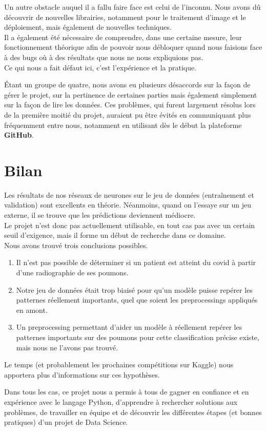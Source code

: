 \documentclass{article}
\begin{document}
	\par Un autre obstacle auquel il a fallu faire face est celui de l'inconnu. Nous avons dû découvrir de nouvelles librairies, notamment pour le traitement d'image et le déploiement, mais également de nouvelles techniques.\\
	Il a également été nécessaire de comprendre, dans une certaine mesure, leur fonctionnement théorique afin de pouvoir nous débloquer quand nous faisions face à des bugs où à des résultats que nous ne nous expliquions pas.\\
	Ce qui nous a fait défaut ici, c'est l'expérience et la pratique.
	
	\'Etant un groupe de quatre, nous avons eu plusieurs désaccords sur la façon de gérer le projet, sur la pertinence de certaines parties mais également simplement sur la façon de lire les données. Ces problèmes, qui furent largement résolus lors de la première moitié du projet, auraient pu être évités en communiquant plus fréquemment entre nous, notamment en utilisant dès le début la plateforme \textbf{GitHub}.
	
	\section*{Bilan}

	Les résultats de nos réseaux de neurones sur le jeu de données (entraînement et validation) sont excellents en théorie. Néanmoins, quand on l'essaye sur un jeu externe, il se trouve que les prédictions deviennent médiocre.\\
	Le projet n'est donc pas actuellement utilisable, en tout cas pas avec un certain seuil d'exigence, mais il forme un début de recherche dans ce domaine.\\
	Nous avons trouvé trois conclusions possibles.
	
	\begin{enumerate}

		\item Il n'est pas possible de déterminer si un patient est atteint du covid à partir d'une radiographie de ses poumons.
		\item Notre jeu de données était trop biaisé pour qu'un modèle puisse repérer les patternes réellement importants, quel que soient les preprocessings appliqués en amont.
		\item Un preprocessing permettant d'aider un modèle à réellement repérer les patternes importants sur des poumons pour cette classification précise existe, mais nous ne l'avons pas trouvé.
	
	\end{enumerate}
	
	Le temps (et probablement les prochaines compétitions sur Kaggle) nous apportera plus d'informations sur ces hypothèses.
	
	Dans tous les cas, ce projet nous a permis à tous de gagner en confiance et en expérience avec le langage Python, d'apprendre à rechercher solutions aux problèmes, de travailler en équipe et de découvrir les différentes étapes (et bonnes pratiques) d'un projet de Data Science.  
\end{document}
